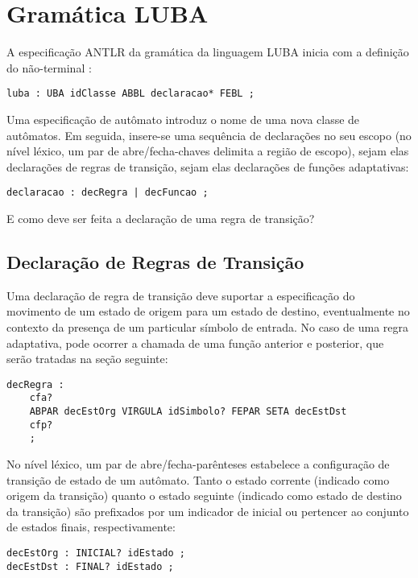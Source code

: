 \section{Gramática LUBA}
\label{sec:isv:gramatica}

A especificação ANTLR da gramática da linguagem LUBA inicia com a definição do não-terminal :

\begin{lstlisting}[style=antlr]
luba : UBA idClasse ABBL declaracao* FEBL ;
\end{lstlisting}

\noindent
Uma especificação de autômato  introduz o nome de uma nova classe de autômatos. Em seguida, insere-se uma sequência de declarações no seu escopo (no nível léxico, um par de abre/fecha-chaves delimita a região de escopo), sejam elas declarações de regras de transição, sejam elas declarações de funções adaptativas:

\begin{lstlisting}[style=antlr]
declaracao : decRegra | decFuncao ;
\end{lstlisting}

\noindent
E como deve ser feita a declaração de uma regra de transição?

\subsection*{Declaração de Regras de Transição}

Uma declaração de regra de transição deve suportar a especificação do movimento de um estado de origem para um estado de destino, eventualmente no contexto da presença de um particular símbolo de entrada. No caso de uma regra adaptativa, pode ocorrer a chamada de uma função anterior e posterior, que serão tratadas na seção seguinte:

\begin{lstlisting}[style=antlr]
decRegra :
	cfa?
	ABPAR decEstOrg VIRGULA idSimbolo? FEPAR SETA decEstDst
	cfp?
	;
\end{lstlisting}

\noindent
No nível léxico, um par de abre/fecha-parênteses estabelece a configuração de transição de estado de um autômato. Tanto o estado corrente (indicado como origem da transição) quanto o estado seguinte (indicado como estado de destino da transição) são prefixados por um indicador de inicial ou pertencer ao conjunto de estados finais, respectivamente:

\begin{lstlisting}[style=antlr]
decEstOrg : INICIAL? idEstado ;
decEstDst : FINAL? idEstado ;
\end{lstlisting}

